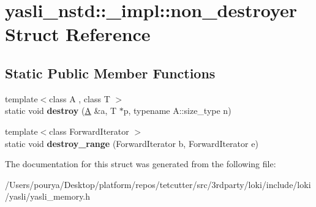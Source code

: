 \hypertarget{structyasli__nstd_1_1__impl_1_1non__destroyer}{}\section{yasli\+\_\+nstd\+:\+:\+\_\+impl\+:\+:non\+\_\+destroyer Struct Reference}
\label{structyasli__nstd_1_1__impl_1_1non__destroyer}
\subsection*{Static Public Member Functions}
\begin{DoxyCompactItemize}
\item 
\hypertarget{structyasli__nstd_1_1__impl_1_1non__destroyer_a418b9ce57b6ddee83db4d903a9bb0424}{}{\footnotesize template$<$class A , class T $>$ }\\static void {\bfseries destroy} (\hyperlink{structA}{A} \&a, T $\ast$p, typename A\+::size\+\_\+type n)\label{structyasli__nstd_1_1__impl_1_1non__destroyer_a418b9ce57b6ddee83db4d903a9bb0424}

\item 
\hypertarget{structyasli__nstd_1_1__impl_1_1non__destroyer_ac37f7ab56dda1cf7cf8f0f73eccd061c}{}{\footnotesize template$<$class Forward\+Iterator $>$ }\\static void {\bfseries destroy\+\_\+range} (Forward\+Iterator b, Forward\+Iterator e)\label{structyasli__nstd_1_1__impl_1_1non__destroyer_ac37f7ab56dda1cf7cf8f0f73eccd061c}

\end{DoxyCompactItemize}


The documentation for this struct was generated from the following file\+:\begin{DoxyCompactItemize}
\item 
/\+Users/pourya/\+Desktop/platform/repos/tetcutter/src/3rdparty/loki/include/loki/yasli/yasli\+\_\+memory.\+h\end{DoxyCompactItemize}
